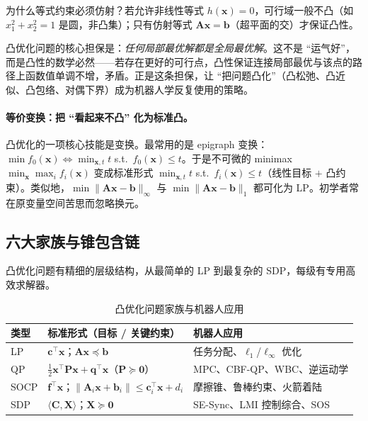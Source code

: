 为什么等式约束必须仿射？若允许非线性等式 $h(\mathbf x)=0$，可行域一般不凸（如 $x_1^2+x_2^2=1$ 是圆，非凸集）；只有仿射等式 $\mathbf A\mathbf x=\mathbf b$（超平面的交）才保证凸性。

\begin{insight}\label{ins:local-global}
凸优化问题的核心担保是：\emph{任何局部最优解都是全局最优解}。这不是 “运气好”，而是凸性的数学必然——若存在更好的可行点，凸性保证连接局部最优与该点的路径上函数值单调不增，矛盾。正是这条担保，让 “把问题凸化”（凸松弛、凸近似、凸包络、对偶下界）成为机器人学反复使用的策略。
\end{insight}

\paragraph{等价变换：把 “看起来不凸” 化为标准凸。}
凸优化的一项核心技能是变换。最常用的是 epigraph 变换：$\min f_0(\mathbf x)\iff\min_{\mathbf x,t}t$ s.t.\ $f_0(\mathbf x)\le t$。于是不可微的 minimax $\min_{\mathbf x}\max_i f_i(\mathbf x)$ 变成标准形式 $\min_{\mathbf x,t}t$ s.t.\ $f_i(\mathbf x)\le t$（线性目标 $+$ 凸约束）。类似地，$\min\|\mathbf A\mathbf x-\mathbf b\|_\infty$ 与 $\min\|\mathbf A\mathbf x-\mathbf b\|_1$ 都可化为 LP。初学者常在原变量空间苦思而忽略换元。

\subsection{六大家族与锥包含链}
\label{subsec:cvx-conic}

凸优化问题有精细的层级结构，从最简单的 LP 到最复杂的 SDP，每级有专用高效求解器。

\begin{table}[H]\centering\small
\caption{凸优化问题家族与机器人应用}
\label{tab:cvx-families}
\begin{tabular}{lll}
\toprule
类型 & 标准形式（目标 / 关键约束） & 机器人应用 \\
\midrule
LP & $\mathbf c^\top\mathbf x$；$\mathbf A\mathbf x\preceq\mathbf b$ & 任务分配、$\ell_1$/$\ell_\infty$ 优化 \\
QP & $\tfrac12\mathbf x^\top\mathbf P\mathbf x+\mathbf q^\top\mathbf x$（$\mathbf P\succeq\mathbf 0$） & MPC、CBF-QP、WBC、逆运动学 \\
SOCP & $\mathbf f^\top\mathbf x$；$\|\mathbf A_i\mathbf x+\mathbf b_i\|\le\mathbf c_i^\top\mathbf x+d_i$ & 摩擦锥、鲁棒约束、火箭着陆 \\
SDP & $\langle\mathbf C,\mathbf X\rangle$；$\mathbf X\succeq\mathbf 0$ & SE-Sync、LMI 控制综合、SOS \\
\bottomrule
\end{tabular}
\end{table}

